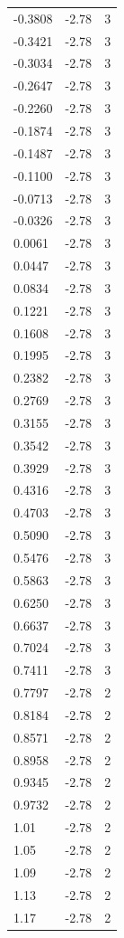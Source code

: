 \begin{longtable}{lrr}
  -0.3808 & -2.78 & 3 \\
  -0.3421 & -2.78 & 3 \\
  -0.3034 & -2.78 & 3 \\
  -0.2647 & -2.78 & 3 \\
  -0.2260 & -2.78 & 3 \\
  -0.1874 & -2.78 & 3 \\
  -0.1487 & -2.78 & 3 \\
  -0.1100 & -2.78 & 3 \\
  -0.0713 & -2.78 & 3 \\
  -0.0326 & -2.78 & 3 \\
  0.0061 & -2.78 & 3 \\
  0.0447 & -2.78 & 3 \\
  0.0834 & -2.78 & 3 \\
  0.1221 & -2.78 & 3 \\
  0.1608 & -2.78 & 3 \\
  0.1995 & -2.78 & 3 \\
  0.2382 & -2.78 & 3 \\
  0.2769 & -2.78 & 3 \\
  0.3155 & -2.78 & 3 \\
  0.3542 & -2.78 & 3 \\
  0.3929 & -2.78 & 3 \\
  0.4316 & -2.78 & 3 \\
  0.4703 & -2.78 & 3 \\
  0.5090 & -2.78 & 3 \\
  0.5476 & -2.78 & 3 \\
  0.5863 & -2.78 & 3 \\
  0.6250 & -2.78 & 3 \\
  0.6637 & -2.78 & 3 \\
  0.7024 & -2.78 & 3 \\
  0.7411 & -2.78 & 3 \\
  0.7797 & -2.78 & 2 \\
  0.8184 & -2.78 & 2 \\
  0.8571 & -2.78 & 2 \\
  0.8958 & -2.78 & 2 \\
  0.9345 & -2.78 & 2 \\
  0.9732 & -2.78 & 2 \\
  1.01 & -2.78 & 2 \\
  1.05 & -2.78 & 2 \\
  1.09 & -2.78 & 2 \\
  1.13 & -2.78 & 2 \\
  1.17 & -2.78 & 2 \\

\end{longtable}
